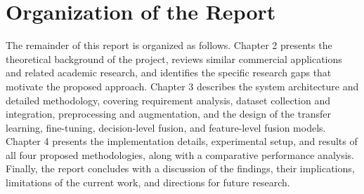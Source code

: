 
\section{Organization of the Report}

The remainder of this report is organized as follows. Chapter 2 presents the theoretical background of the project, reviews similar commercial applications and related academic research, and identifies the specific research gaps that motivate the proposed approach. Chapter 3 describes the system architecture and detailed methodology, covering requirement analysis, dataset collection and integration, preprocessing and augmentation, and the design of the transfer learning, fine-tuning, decision-level fusion, and feature-level fusion models. Chapter 4 presents the implementation details, experimental setup, and results of all four proposed methodologies, along with a comparative performance analysis. Finally, the report concludes with a discussion of the findings, their implications, limitations of the current work, and directions for future research.